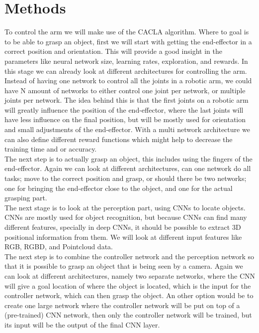 \section{Methods}
To control the arm we will make use of the CACLA algorithm. Where to goal is to be able to grasp an object, first we will start with getting the end-effector in a correct position and orientation. This will provide a 
good insight in the parameters like neural network size, learning rates, exploration, and rewards. In this stage we can already look at different architectures for controlling the arm. Instead of having one network to
control all the joints in a robotic arm, we could have N amount of networks to either control one joint per network, or multiple joints per network. The idea behind this is that the first joints on a robotic arm will 
greatly influence the position of the end-effector, where the last joints will have less influence on the final position, but will be mostly used for orientation and small adjustments of the end-effector. With a multi network
architecture we can also define different reward functions which might help to decrease the training time and or accuracy. \\
The next step is to actually grasp an object, this includes using the fingers of the end-effector. Again we can look at different architectures, can one network do all tasks; move to the correct position and grasp, or should
there be two networks; one for bringing the end-effector close to the object, and one for the actual grasping part. \\
The next stage is to look at the perception part, using CNNs to locate objects. CNNs are mostly used for object recognition, but because CNNs can find many different features, specially in deep CNNs, it should be possible to 
extract 3D positional information from them. We will look at different input features like RGB, RGBD, and Pointcloud data. \\
The next step is to combine the controller network and the perception network so that it is possible to grasp an object that is being seen by a camera. Again we can look at different architectures, namely two separate
networks, where the CNN will give a goal location of where the object is located, which is the input for the controller network, which can then grasp the object. An other option would be to create one large network where the 
controller network will be put on top of a (pre-trained) CNN network, then only the controller network will be trained, but its input will be the output of the final CNN layer. \\
